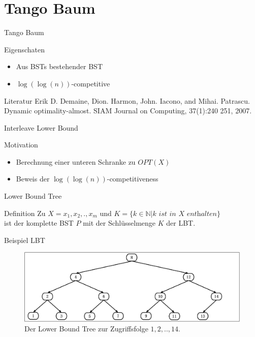 \documentclass[11pt]{beamer}
\begin{document}
\section{Tango Baum}
	\tableofcontents[]   
 \begin{frame} {Tango Baum} 
 	\begin{block}{Eigenschaten}
 		\begin{itemize}
 			\item 	Aus BSTs bestehender BST
 			\item $\log\left(\log\left(n\right)\right)$-competitive		
 		\end{itemize}
    \end{block}
	\begin{block}{Literatur}
	Erik D. Demaine, Dion. Harmon, John. Iacono, and Mihai. Patrascu.
	Dynamic optimality-almost. SIAM Journal on Computing, 37(1):240
	251, 2007.
    \end{block}
\end{frame}	  
 \begin{frame} {Interleave Lower Bound} 
 	\begin{block}{Motivation}
 	\begin{itemize}
 		\item Berechnung einer unteren Schranke zu $\mathit{OPT\left(X\right)}$
 		\item Beweis der $\log\left( \log \left(n\right)\right)$-competitiveness	
 	\end{itemize}
     \end{block}
\end{frame}	  

 \begin{frame} {Lower Bound Tree} 
	\begin{block}{Definition}
		  Zu $X = x_1,x_2,.,x_m$ und $K = \{k \in \mathbb{N} \vert k \textit{ ist in $X$ enthalten}\}$\\
		  \pause
		  ist der komplette BST $P$ mit der Schlüsselmenge $K$ der LBT. 
		 
	\end{block}
\end{frame}

\begin{frame} {Beispiel LBT} 
\begin{figure}[H]
	\centering
	\includegraphics[width=1\textwidth]{"Medien/pres/lowerBoundTree"}
	\caption{Der Lower Bound Tree zur Zugriffsfolge $1 ,2, .., 14$.  }
	\label{fig:demlowerBoundTree}
\end{figure}
\end{frame}		
\end{document}
